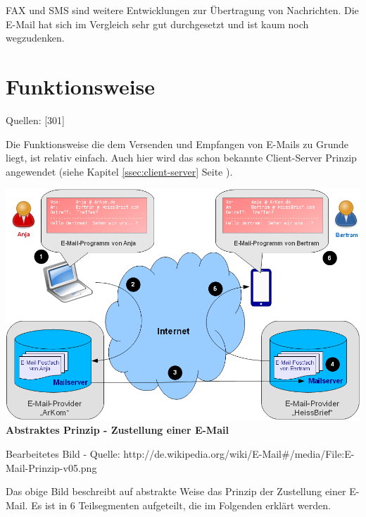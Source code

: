 \documentclass[12pt,a4paper]{report}
\begin{document}
\begin{onehalfspace}
FAX und SMS sind weitere Entwicklungen zur Übertragung von Nachrichten. Die E-Mail hat sich im Vergleich sehr gut durchgesetzt und ist kaum noch wegzudenken. 
\section{Funktionsweise}
\begin{flushright}
\begin{tiny}
Quellen: [301]
\end{tiny}
\end{flushright}
Die Funktionsweise die dem Versenden und Empfangen von E-Mails zu Grunde liegt, ist relativ einfach. Auch hier wird das schon bekannte Client-Server Prinzip angewendet (siehe Kapitel \ref{ssec:client-server} Seite \pageref{ssec:client-server}).\\

\begin{center}
\includegraphics[scale=0.6]{../docs/lyaton/graphics/E-Mail-Prinzip.png}\\
\textbf{Abstraktes Prinzip - Zustellung einer E-Mail}\\
\begin{scriptsize}
Bearbeitetes Bild - Quelle: http://de.wikipedia.org/wiki/E-Mail\#/media/File:E-Mail-Prinzip-v05.png
\end{scriptsize}
\end{center}
\vspace{0.5cm}

Das obige Bild beschreibt auf abstrakte Weise das Prinzip der Zustellung einer E-Mail. Es ist in 6 Teilsegmenten aufgeteilt, die im Folgenden erklärt werden.


\end{onehalfspace}
\end{document}

